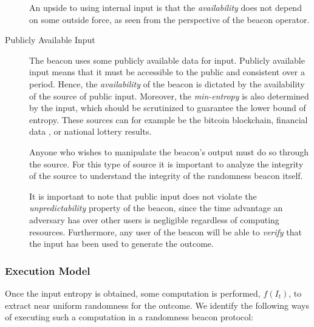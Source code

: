 \begin{description}
        An upside to using internal input is that the \emph{availability} does not depend on some outside force, as seen from the perspective of the beacon operator.

    \item[Publicly Available Input]
        The beacon uses some publicly available data for input.
        Publicly available input means that it must be accessible to the public and consistent over a period.
        Hence, the \emph{availability} of the beacon is dictated by the availability of the source of public input.
        Moreover, the \emph{min-entropy} is also determined by the input, which should be scrutinized to guarantee the lower bound of entropy.
        These sources can for example be the bitcoin blockchain, financial data , or national lottery results.

        Anyone who wishes to manipulate the beacon's output must do so through the source.
        For this type of source it is important to analyze  the integrity of the source to understand the integrity of the randomness beacon itself.

        It is important to note that public input does not violate the \emph{unpredictability} property of the beacon, since the time advantage an adversary has over other users is negligible regardless of computing resources.
        Furthermore, any user of the beacon will be able to \emph{verify} that the input has been used to generate the outcome.

\end{description}

\subsubsection{Execution Model}
Once the input entropy is obtained, some computation is performed, $f(I_t)$, to extract near uniform randomness for the outcome.
We identify the following ways of executing such a computation in a randomness beacon protocol:

